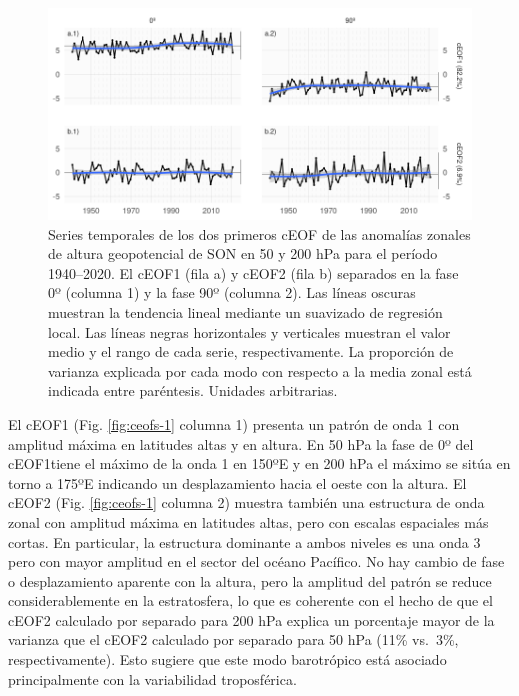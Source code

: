 \documentclass[12pt,oneside,a4paper]{reedthesis}
\begin{document}
\begin{figure}

{\centering \includegraphics{figures/20-ceofs/extended-series-1} 

}

\caption{Series temporales de los dos primeros cEOF de las anomalías zonales de altura geopotencial de SON en 50 y 200 hPa para el período 1940--2020. El cEOF1 (fila a) y cEOF2 (fila b) separados en la fase 0º (columna 1) y la fase 90º (columna 2). Las líneas oscuras muestran la tendencia lineal mediante un suavizado de regresión local. Las líneas negras horizontales y verticales muestran el valor medio y el rango de cada serie, respectivamente. La proporción de varianza explicada por cada modo con respecto a la media zonal está indicada entre paréntesis. Unidades arbitrarias.}\label{fig:extended-series}
\end{figure}

El cEOF1 (Fig. \ref{fig:ceofs-1} columna 1) presenta un patrón de onda 1 con amplitud máxima en latitudes altas y en altura.
En 50 hPa la fase de 0º del cEOF1tiene el máximo de la onda 1 en 150ºE y en 200 hPa el máximo se sitúa en torno a 175ºE indicando un desplazamiento hacia el oeste con la altura.
El cEOF2 (Fig. \ref{fig:ceofs-1} columna 2) muestra también una estructura de onda zonal con amplitud máxima en latitudes altas, pero con escalas espaciales más cortas.
En particular, la estructura dominante a ambos niveles es una onda 3 pero con mayor amplitud en el sector del océano Pacífico.
No hay cambio de fase o desplazamiento aparente con la altura, pero la amplitud del patrón se reduce considerablemente en la estratosfera, lo que es coherente con el hecho de que el cEOF2 calculado por separado para 200 hPa explica un porcentaje mayor de la varianza que el cEOF2 calculado por separado para 50 hPa (11\% vs.~3\%, respectivamente).
Esto sugiere que este modo barotrópico está asociado principalmente con la variabilidad troposférica.
\end{document}
